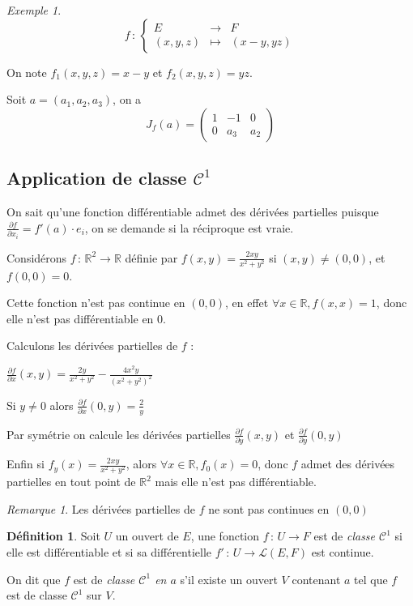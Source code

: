 \documentclass[]{article}
\theoremstyle{remark}
\newtheorem{myrem}{Remarque}
\newtheorem{myexmpl}{Exemple}
\theoremstyle{definition}
\newtheorem{mydef}{Définition}
\newcommand{\func}[5]{
#1 \, : \, \left\{ \begin{array}{lcl}
	#2 & \longrightarrow & #3 \\
	#4 & \longmapsto & #5
\end{array}
\right.
}
\newcommand{\funcshort}[3]{
#1 \, : \, #2 \longrightarrow #3
}
\begin{document}
\begin{myexmpl}
	$$\func{f}{E}{F}{(x, y, z)}{(x-y, yz)}$$
	
	On note $f_1(x, y, z) = x - y$ et $f_2(x, y, z) = yz$.
	
	Soit $a=(a_1, a_2, a_3)$, on a $$J_f(a) = 
	\left(
	\begin{array}{ccc}
		1 & -1 & 0 \\
		0 & a_3 & a_2
	\end{array}\right)$$
\end{myexmpl}

\subsection{Application de classe $\mathcal{C}^1$}

On sait qu'une fonction différentiable admet des dérivées partielles puisque $\displaystyle \frac{\partial{f}}{\partial x_i} = f'(a) \cdot e_i$, on se demande si la réciproque est vraie.

Considérons $\funcshort{f}{\mathbb{R}^2}{\mathbb{R}}$ définie par $\displaystyle f(x, y) = \frac{2 xy}{x^2 + y^2}$ si $(x, y) \neq (0, 0)$, et $f(0, 0) = 0$.

Cette fonction n'est pas continue en $(0, 0)$, en effet $\forall x \in \mathbb{R}, f(x, x) = 1$, donc elle n'est pas différentiable en 0.

Calculons les dérivées partielles de $f$ :

$\displaystyle \frac{\partial f}{\partial x}(x, y) = \frac{2 y}{x^2 + y^2} - \frac{4x^2 y}{(x^2+y^2)^2}$

Si $y \neq 0$ alors $\displaystyle \frac{\partial f}{\partial x}(0, y) = \frac{2}{y}$

Par symétrie on calcule les dérivées partielles 
$\displaystyle \frac{\partial f}{\partial y}(x, y)$ et 
$\displaystyle \frac{\partial f}{\partial y}(0, y)$

Enfin si $\displaystyle f_y(x) = \frac{2 xy}{x^2 + y^2}$, alors $\forall x \in \mathbb{R}, f_0(x) = 0$, donc $f$ admet des dérivées partielles en tout point de $\mathbb{R}^2$ mais elle n'est pas différentiable.

\begin{myrem}
	Les dérivées partielles de $f$ ne sont pas continues en $(0, 0)$
\end{myrem}

\begin{mydef}
	Soit $U$ un ouvert de $E$, une fonction $\funcshort{f}{U}{F}$ est de \textit{classe $\mathcal{C}^1$} si elle est différentiable et si sa différentielle $\funcshort{f'}{U}{\mathcal{L}(E, F)}$ est continue.
	
	On dit que $f$ est de \textit{classe $\mathcal{C}^1$ en $a$} s'il existe un ouvert $V$ contenant $a$ tel que $f$ est de classe $\mathcal{C}^1$ sur $V$.
\end{mydef}
\end{document}
